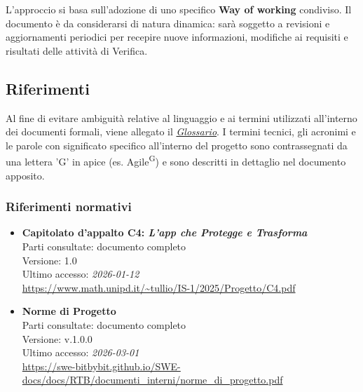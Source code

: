 \documentclass[a4paper,12pt]{article}
\begin{document}
L'approccio si basa sull'adozione di uno specifico \textbf{Way of working} condiviso. Il documento è da considerarsi di natura dinamica: sarà soggetto a revisioni e aggiornamenti periodici per recepire nuove informazioni, modifiche ai requisiti e risultati delle attività di Verifica.


\subsection{Riferimenti} \label{sec:riferimenti}
Al fine di evitare ambiguità relative al linguaggio e ai termini utilizzati all'interno dei documenti formali, viene allegato il \href{https://swe-bitbybit.github.io/SWE-docs/docs/RTB/documenti_interni/Glossario.pdf}{\textit{Glossario}}.
I termini tecnici, gli acronimi e le parole con significato specifico all'interno del progetto sono contrassegnati da una lettera 'G' in apice (es. Agile\textsuperscript{G}) e sono descritti in dettaglio nel documento apposito.

\subsubsection{Riferimenti normativi}\label{sec:riferimenti_normativi}
\begin{itemize}
\raggedright
\item \textbf{Capitolato d'appalto C4: \emph{L'app che Protegge e Trasforma}}\\
Parti consultate: documento completo\\
Versione: 1.0\\
Ultimo accesso: \textit{2026-01-12}\\
\url{https://www.math.unipd.it/~tullio/IS-1/2025/Progetto/C4.pdf}

\item \textbf{Norme di Progetto}\\
Parti consultate: documento completo\\
Versione: v.1.0.0\\
Ultimo accesso: \textit{2026-03-01}\\
\url{https://swe-bitbybit.github.io/SWE-docs/docs/RTB/documenti_interni/norme_di_progetto.pdf}
\end{itemize}
\end{document}
